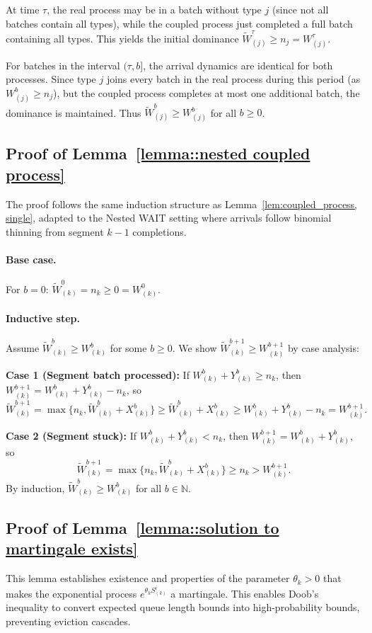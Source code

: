 At time $\tau$, the real process may be in a batch without type $j$ (since not all batches contain all types), while the coupled process just completed a full batch containing all types. This yields the initial dominance $\tilde{W}_{(j)}^\tau\geq n_j = W_{(j)}^\tau$.

For batches in the interval $(\tau, b]$, the arrival dynamics are identical for both processes. Since type $j$ joins every batch in the real process during this period (as $W^b_{(j)}\geq n_j$), but the coupled process completes at most one additional batch, the dominance is maintained. Thus $\tilde{W}^b_{(j)}\geq W^b_{(j)}$ for all $b\geq 0$.

\subsection{Proof of Lemma~\ref{lemma::nested coupled process}}\label{appendix_lemma::proof of nested coupled process}
The proof follows the same induction structure as Lemma~\ref{lem:coupled_process, single}, adapted to the Nested WAIT setting where arrivals follow binomial thinning from segment $k-1$ completions.

\paragraph{Base case.} For $b = 0$: $\tilde{W}_{(k)}^0 = n_{k}\geq 0=W_{(k)}^0$.

\paragraph{Inductive step.} Assume $\tilde{W}^b_{(k)}\geq W^b_{(k)}$ for some $b\geq 0$. We show $\tilde{W}^{b+1}_{(k)}\geq W^{b+1}_{(k)}$ by case analysis:

\textbf{Case 1 (Segment batch processed):} If $W^b_{(k)}+ Y^b_{(k)}\geq n_k$, then $W^{b+1}_{(k)}= W^{b}_{(k)}+Y^b_{(k)} - n_k$, so
$$ \tilde{W}^{b+1}_{(k)}=  \max\{ n_{k},\tilde{W}^{b}_{(k)} + X^b_{(k)}\} \geq \tilde{W}^{b}_{(k)} + X^b_{(k)}\geq {W}^{b}_{(k)} + Y^b_{(k)}-n_k=W^{b+1}_{(k)}.$$

\textbf{Case 2 (Segment stuck):} If $W^b_{(k)}+ Y^b_{(k)}<n_k$, then $W^{b+1}_{(k)}= W^{b}_{(k)}+Y^b_{(k)}$, so
$$\tilde{W}^{b+1}_{(k)}=  \max\{ n_{k},\tilde{W}^{b}_{(k)} + X^b_{(k)}\} \geq n_{k}> W^{b+1}_{(k)}.$$
By induction, $\tilde{W}^b_{(k)}\geq W^b_{(k)}$ for all $b\in \mathbb{N}$.

\subsection{Proof of Lemma~\ref{lemma::solution to martingale exists}}\label{appendix_lemma::proof of solution to martingale exists}
This lemma establishes existence and properties of the parameter $\theta_k>0$ that makes the exponential process $e^{\theta_k S^i_{(k)}}$ a martingale. This enables Doob's inequality to convert expected queue length bounds into high-probability bounds, preventing eviction cascades.

